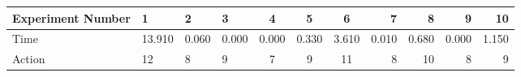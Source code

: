 \documentclass[8pt]{article}
\begin{document}
\begin{landscape}
\begin{tabular}{ | l | l | l | l | c | c | c | r | r | r | r | }
 \hline 
Experiment Number & 1 & 2 & 3 & 4 & 5 & 6 & 7 & 8 & 9 & 10\\ \hline
Time & 13.910 & 0.060 & 0.000 & 0.000 & 0.330 & 3.610 & 0.010 & 0.680 & 0.000 & 1.150\\ \hline
Action & 12 & 8 & 9 & 7 & 9 & 11 & 8 & 10 & 8 & 9\\ \hline\end{tabular}
\end{landscape}
\end{document}
